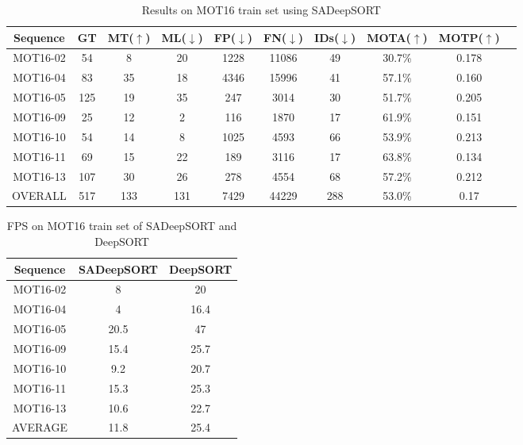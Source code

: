 \begin{table}[H]
    \begin{center}
     \begin{tabular}{||c | c | c | c | c | c | c | c | c | c ||} 
     \hline
    Sequence & GT & MT($\uparrow$) & ML($\downarrow$) & FP($\downarrow$) & FN($\downarrow$) & IDs($\downarrow$) & MOTA($\uparrow$) & MOTP($\uparrow$) \\
    \hline
    \hline
    MOT16-02 & 54 &  8  & 20 & 1228 & 11086 & 49 & 30.7\% & 0.178 \\
     \hline
    MOT16-04 & 83 & 35  & 18 & 4346 & 15996 &  41 & 57.1\% & 0.160\\
    \hline
    MOT16-05 & 125 & 19  & 35 & 247 & 3014 & 30 & 51.7\% & 0.205 \\
    \hline
    MOT16-09 & 25 & 12  &  2 & 116 & 1870 & 17 & 61.9\% & 0.151 \\
    \hline
    MOT16-10 & 54 & 14  & 8 & 1025 & 4593 & 66 & 53.9\% & 0.213 \\
    \hline
    MOT16-11 &  69 &  15 &  22 & 189 & 3116 & 17 & 63.8\% & 0.134\\
    \hline
    MOT16-13 & 107 & 30 &  26 & 278 & 4554 & 68 & 57.2\% & 0.212\\
    \hline
    OVERALL  & 517 & 133 &  131 & 7429 & 44229 & 288 & 53.0\% & 0.17\\
    
    \hline
    \end{tabular}
    \end{center}
        \caption{Results on MOT16 train set using SADeepSORT}
        \label{tab:sa_result}
\end{table}
    
\begin{table}[H]
    \begin{center}
     \begin{tabular}{||c | c | c ||} 
     \hline
    Sequence & SADeepSORT & DeepSORT \\
    \hline
    \hline
    MOT16-02 & 8 & 20 \\
     \hline
    MOT16-04 & 4 & 16.4\\
    \hline
    MOT16-05 & 20.5 & 47 \\
    \hline
    MOT16-09 & 15.4 & 25.7 \\
    \hline
    MOT16-10 & 9.2 & 20.7\\
    \hline
    MOT16-11 &  15.3 &  25.3\\
    \hline
    MOT16-13 & 10.6 & 22.7\\
    \hline
    AVERAGE  & 11.8 & 25.4 \\
    
    \hline
    \end{tabular}
    \end{center}
        \caption{FPS on MOT16 train set of SADeepSORT and DeepSORT}
        \label{tab:fps_com}
\end{table}

